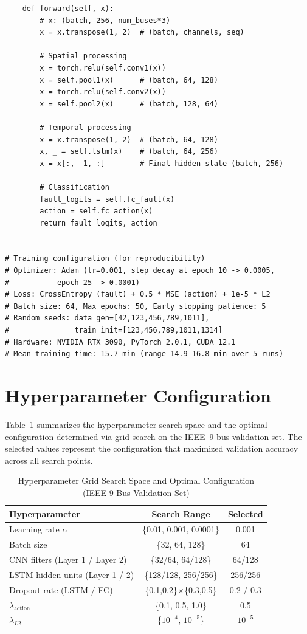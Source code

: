\documentclass[journal]{IEEEtran}
\begin{document}
{\begin{verbatim}
    def forward(self, x):
        # x: (batch, 256, num_buses*3)
        x = x.transpose(1, 2)  # (batch, channels, seq)

        # Spatial processing
        x = torch.relu(self.conv1(x))
        x = self.pool1(x)      # (batch, 64, 128)
        x = torch.relu(self.conv2(x))
        x = self.pool2(x)      # (batch, 128, 64)

        # Temporal processing
        x = x.transpose(1, 2)  # (batch, 64, 128)
        x, _ = self.lstm(x)    # (batch, 64, 256)
        x = x[:, -1, :]        # Final hidden state (batch, 256)

        # Classification
        fault_logits = self.fc_fault(x)
        action = self.fc_action(x)
        return fault_logits, action


# Training configuration (for reproducibility)
# Optimizer: Adam (lr=0.001, step decay at epoch 10 -> 0.0005,
#           epoch 25 -> 0.0001)
# Loss: CrossEntropy (fault) + 0.5 * MSE (action) + 1e-5 * L2
# Batch size: 64, Max epochs: 50, Early stopping patience: 5
# Random seeds: data_gen=[42,123,456,789,1011],
#               train_init=[123,456,789,1011,1314]
# Hardware: NVIDIA RTX 3090, PyTorch 2.0.1, CUDA 12.1
# Mean training time: 15.7 min (range 14.9-16.8 min over 5 runs)
\end{verbatim}
}

\section{Hyperparameter Configuration}
\label{app:hyperparams}

Table~\ref{tab:hyperparams} summarizes the hyperparameter search space and the optimal configuration determined via grid search on the IEEE~9-bus validation set. The selected values represent the configuration that maximized validation accuracy across all search points.

\begin{table}[h]
\centering
\caption{Hyperparameter Grid Search Space and Optimal Configuration (IEEE 9-Bus Validation Set)}
\label{tab:hyperparams}
\begin{tabular}{lcc}
\toprule
\textbf{Hyperparameter} & \textbf{Search Range} & \textbf{Selected} \\
\midrule
Learning rate $\alpha$            & \{0.01, 0.001, 0.0001\} & 0.001 \\
Batch size                        & \{32, 64, 128\}         & 64 \\
CNN filters (Layer 1 / Layer 2)   & \{32/64, 64/128\}       & 64/128 \\
LSTM hidden units (Layer 1 / 2)   & \{128/128, 256/256\}    & 256/256 \\
Dropout rate (LSTM / FC)         & \{0.1,0.2\}$\times$\{0.3,0.5\} & 0.2 / 0.3 \\
$\lambda_{\text{action}}$         & \{0.1, 0.5, 1.0\}      & 0.5 \\
$\lambda_{L2}$                    & \{$10^{-4}$, $10^{-5}$\}  & $10^{-5}$ \\
\bottomrule
\end{tabular}
\end{table}
\end{document}

